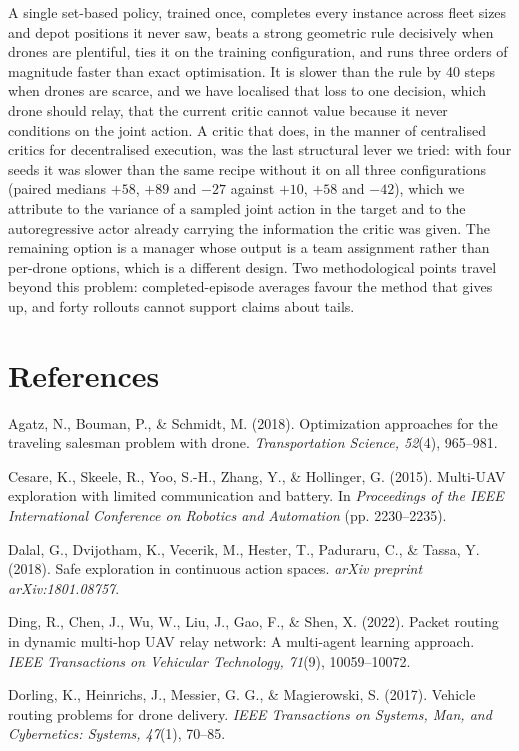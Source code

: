 \documentclass[12pt]{article}
\begin{document}
A single set-based policy, trained once, completes every instance across fleet sizes and depot
positions it never saw, beats a strong geometric rule decisively when drones are plentiful, ties
it on the training configuration, and runs three orders of magnitude faster than exact
optimisation. It is slower than the rule by 40 steps when drones are scarce, and we have
localised that loss to one decision, which drone should relay, that the current critic cannot
value because it never conditions on the joint action. A critic that does, in the manner of
centralised critics for decentralised execution, was the last structural lever we tried: with
four seeds it was slower than the same recipe without it on all three configurations (paired
medians $+58$, $+89$ and $-27$ against $+10$, $+58$ and $-42$), which we attribute to the variance
of a sampled joint action in the target and to the autoregressive actor already carrying the
information the critic was given. The remaining option is a manager whose output is a team
assignment rather than per-drone options, which is a different design. Two methodological points travel beyond this problem: completed-episode averages
favour the method that gives up, and forty rollouts cannot support claims about tails.

\section*{References}

\noindent Agatz, N., Bouman, P., \& Schmidt, M. (2018). Optimization approaches for the traveling
salesman problem with drone. \textit{Transportation Science, 52}(4), 965--981.

\noindent Cesare, K., Skeele, R., Yoo, S.-H., Zhang, Y., \& Hollinger, G. (2015). Multi-UAV
exploration with limited communication and battery. In \textit{Proceedings of the IEEE
International Conference on Robotics and Automation} (pp. 2230--2235).

\noindent Dalal, G., Dvijotham, K., Vecerik, M., Hester, T., Paduraru, C., \& Tassa, Y. (2018).
Safe exploration in continuous action spaces. \textit{arXiv preprint arXiv:1801.08757}.

\noindent Ding, R., Chen, J., Wu, W., Liu, J., Gao, F., \& Shen, X. (2022). Packet routing in
dynamic multi-hop UAV relay network: A multi-agent learning approach. \textit{IEEE Transactions on
Vehicular Technology, 71}(9), 10059--10072.

\noindent Dorling, K., Heinrichs, J., Messier, G. G., \& Magierowski, S. (2017). Vehicle routing
problems for drone delivery. \textit{IEEE Transactions on Systems, Man, and Cybernetics: Systems,
47}(1), 70--85.
\end{document}
